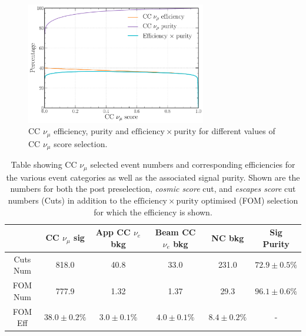 \begin{figure} %
    \includegraphics[width=0.7\textwidth]{diagrams/7-results/final_numu_eff_curves.pdf}
    \caption[CC $\nu_{\mu}$ efficiency, purity and $\mathrm{efficiency}\times\mathrm{purity}$]
    {CC $\nu_{\mu}$ efficiency, purity and $\mathrm{efficiency}\times\mathrm{purity}$ for
        different values of CC $\nu_{\mu}$ score selection.}
    \label{fig:final_numu_eff_curves}
\end{figure}

\begin{table}
    \begin{tabular}{cccccc}
                 & CC $\nu_{\mu}$ sig & App CC $\nu_{e}$ bkg & Beam CC $\nu_{e}$ bkg & NC bkg        & Sig Purity     \\
        \midrule
        Cuts Num & 818.0              & 40.8                 & 33.0                  & 231.0         & $72.9\pm0.5\%$ \\
        FOM Num  & 777.9              & 1.32                 & 1.37                  & 29.3          & $96.1\pm0.6\%$ \\
        \midrule
        FOM Eff  & $38.0\pm0.2\%$     & $3.0\pm0.1\%$        & $4.0\pm0.1\%$         & $8.4\pm0.2\%$ & -              \\
    \end{tabular}
    \caption[Table showing CC $\nu_{\mu}$ selected event numbers, efficiencies and signal purity.]
    {Table showing CC $\nu_{\mu}$ selected event numbers and corresponding efficiencies for the
        various event categories as well as the associated signal purity. Shown are the numbers
        for both the post preselection, \emph{cosmic score} cut, and \emph{escapes score} cut
        numbers (Cuts) in addition to the $\mathrm{efficiency}\times\mathrm{purity}$ optimised
        (FOM) selection for which the efficiency is shown.}
    \label{tab:numu_selection}
\end{table}

